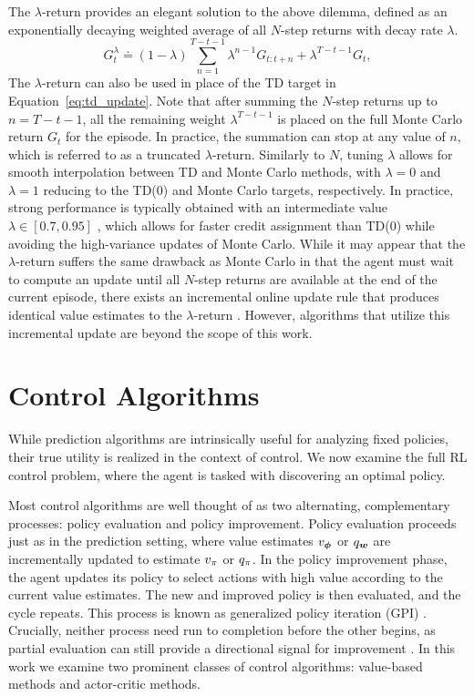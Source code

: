 The $\lambda$-return provides an elegant solution to the above dilemma, defined as an exponentially decaying weighted average of all $N$-step returns with decay rate $\lambda$.
\begin{equation}
    G_t^\lambda \doteq (1 - \lambda) \sum_{n=1}^{T - t - 1} \lambda^{n-1} G_{t:t+n} + \lambda^{T - t - 1} G_t,
    \label{eq:lambda_return}
\end{equation}
The $\lambda$-return can also be used in place of the TD target in Equation~\eqref{eq:td_update}. Note that after summing the $N$-step returns up to $n = T - t - 1$, all the remaining weight $\lambda^{T-t-1}$ is placed on the full Monte Carlo return $G_t$ for the episode. In practice, the summation can stop at any value of $n$, which is referred to as a truncated $\lambda$-return. Similarly to $N$, tuning $\lambda$ allows for smooth interpolation between TD and Monte Carlo methods, with $\lambda = 0$ and $\lambda = 1$ reducing to the TD(0) and Monte Carlo targets, respectively. In practice, strong performance is typically obtained with an intermediate value $\lambda \in [0.7, 0.95]$ , which allows for faster credit assignment than TD(0) while avoiding the high-variance updates of Monte Carlo.
While it may appear that the $\lambda$-return suffers the same drawback as Monte Carlo in that the agent must wait to compute an update until all $N$-step returns are available at the end of the current episode, there exists an incremental online update rule that produces identical value estimates to the $\lambda$-return . However, algorithms that utilize this incremental update are beyond the scope of this work. 
\section{Control Algorithms}
While prediction algorithms are intrinsically useful for analyzing fixed policies, their true utility is realized in the context of control. We now examine the full RL control problem, where the agent is tasked with discovering an optimal policy. 

Most control algorithms are well thought of as two alternating, complementary processes: policy evaluation and policy improvement. Policy evaluation proceeds just as in the prediction setting, where value estimates $v_{\bm \phi}$ or $q_{\bm w}$ are incrementally updated to estimate $v_{\pi}$ or $q_{\pi}$. In the policy improvement phase, the agent updates its policy to select actions with high value according to the current value estimates. The new and improved policy is then evaluated, and the cycle repeats. This process is known as generalized policy iteration (GPI) \cite{sutton1998introduction}. Crucially, neither process need run to completion before the other begins, as partial evaluation can still provide a directional signal for improvement . In this work we examine two prominent classes of control algorithms: value-based methods and actor-critic methods. 

